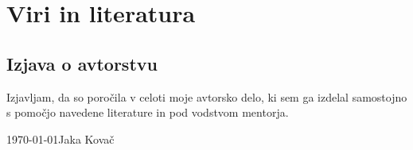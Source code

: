 \documentclass[12pt]{article}
\begin{document}
\newpage
\begingroup
\makeatletter
	\section{Viri in literatura}
	\nocite{*}
	\printbibliography[heading=none]
\makeatother
\endgroup
\newpage

\begin{samepage}
	\thispagestyle{empty}
	\section*{Izjava o avtorstvu}
	Izjavljam, da so poročila v celoti moje avtorsko delo, ki sem ga 
	izdelal samostojno s pomočjo navedene literature in pod vodstvom mentorja.

	\vfill
	
	\today \hfill Jaka Kovač
	
	\vspace{3 cm}
\end{samepage}
\end{document}
